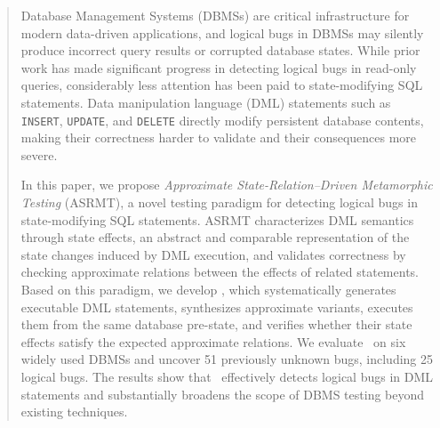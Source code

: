 \begin{abstract}
	Database Management Systems (DBMSs) are critical infrastructure for modern data-driven applications, and logical bugs in DBMSs may silently produce incorrect query results or corrupted database states. 
	While prior work has made significant progress in detecting logical bugs in read-only queries, considerably less attention has been paid to state-modifying SQL statements. 
	Data manipulation language (DML) statements such as \texttt{INSERT}, \texttt{UPDATE}, and \texttt{DELETE} directly modify persistent database contents, making their correctness harder to validate and their consequences more severe. 
	
	In this paper, we propose \textit{Approximate State-Relation--Driven Metamorphic Testing} (ASRMT), a novel testing paradigm for detecting logical bugs in state-modifying SQL statements. 
	ASRMT characterizes DML semantics through state effects, an abstract and comparable representation of the state changes induced by DML execution, and validates correctness by checking approximate relations between the effects of related statements. 
	Based on this paradigm, we develop \toolname, which systematically generates executable DML statements, synthesizes approximate variants, executes them from the same database pre-state, and verifies whether their state effects satisfy the expected approximate relations. 
	We evaluate \toolname\ on six widely used DBMSs and uncover 51 previously unknown bugs, including 25 logical bugs. 
	The results show that \toolname\ effectively detects logical bugs in DML statements and substantially broadens the scope of DBMS testing beyond existing techniques.
\end{abstract}

